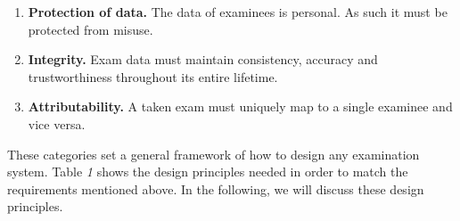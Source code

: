 \begin{enumerate}
\def\labelenumi{\arabic{enumi}.}
\setcounter{enumi}{5}
\tightlist
\item
  \textbf{Protection of data.} The data of examinees is personal. As
  such it must be protected from misuse.
\item
  \textbf{Integrity.} Exam data must maintain consistency, accuracy and
  trustworthiness throughout its entire lifetime.
\item
  \textbf{Attributability.} A taken exam must uniquely map to a single
  examinee and vice versa.
\end{enumerate}

These categories set a general framework of how to design any
examination system. Table \emph{1} shows the design principles needed in
order to match the requirements mentioned above. In the following, we
will discuss these design principles.

